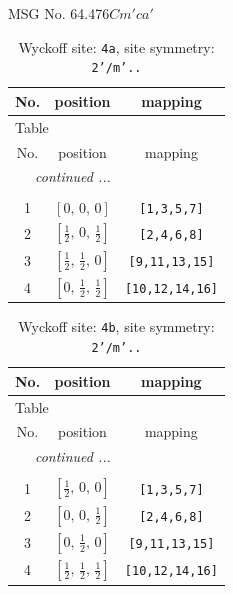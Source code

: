 \documentclass[fleqn,8pt]{jsarticle}
\begin{document}
\setcounter{MaxMatrixCols}{32}

\renewcommand{\tablename}{Table~}
\renewcommand{\figurename}{Figure~}
\begin{center}
\LARGE
MSG No. 64.476\quad$Cm'ca'$
\end{center}
\renewcommand{\arraystretch}{1.2}
\begin{longtable}{ccc}
\caption{Wyckoff site: {\tt 4a}, site symmetry: {\tt 2'/m'..}}
 \\
 \hline \hline
No. & position & mapping \\ \hline \endfirsthead

\multicolumn{2}{l}{\tablename\ \thetable{}} \\
 \hline \hline
No. & position & mapping \\ \hline \endhead

 \hline \hline
\multicolumn{2}{r}{\footnotesize\it continued ...} \\ \endfoot

 \hline \hline
\multicolumn{2}{r}{} \\ \endlastfoot

1 & $\left[ 0,\, 0,\, 0 \right]$ & {\tt [1,3,5,7]} \\ \hline
2 & $\left[ \frac{1}{2},\, 0,\, \frac{1}{2} \right]$ & {\tt [2,4,6,8]} \\ \hline
3 & $\left[ \frac{1}{2},\, \frac{1}{2},\, 0 \right]$ & {\tt [9,11,13,15]} \\ \hline
4 & $\left[ 0,\, \frac{1}{2},\, \frac{1}{2} \right]$ & {\tt [10,12,14,16]} \\
\end{longtable}
\renewcommand{\arraystretch}{1.2}
\begin{longtable}{ccc}
\caption{Wyckoff site: {\tt 4b}, site symmetry: {\tt 2'/m'..}}
 \\
 \hline \hline
No. & position & mapping \\ \hline \endfirsthead

\multicolumn{2}{l}{\tablename\ \thetable{}} \\
 \hline \hline
No. & position & mapping \\ \hline \endhead

 \hline \hline
\multicolumn{2}{r}{\footnotesize\it continued ...} \\ \endfoot

 \hline \hline
\multicolumn{2}{r}{} \\ \endlastfoot

1 & $\left[ \frac{1}{2},\, 0,\, 0 \right]$ & {\tt [1,3,5,7]} \\ \hline
2 & $\left[ 0,\, 0,\, \frac{1}{2} \right]$ & {\tt [2,4,6,8]} \\ \hline
3 & $\left[ 0,\, \frac{1}{2},\, 0 \right]$ & {\tt [9,11,13,15]} \\ \hline
4 & $\left[ \frac{1}{2},\, \frac{1}{2},\, \frac{1}{2} \right]$ & {\tt [10,12,14,16]} \\
\end{longtable}
\end{document}
